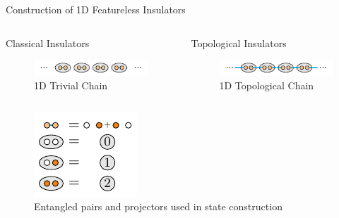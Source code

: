 \begin{frame}{Construction of 1D Featureless Insulators}
\vskip-1.5cm		
\begin{columns}[T]
	\begin{column}[T]{.5\textwidth}
		\begin{block}{Classical Insulators}
			\vskip0.55cm
			\begin{figure}
				\includegraphics[width=\linewidth] {diagrams/haldane_insulator_chain_trivial.pdf}
				\caption{1D Trivial Chain}
			\end{figure}
		\end{block}
	\end{column}
	\begin{column}[T]{.5\textwidth}
		\begin{block}{Topological Insulators}
			\vskip0.45cm
			\begin{figure}
				\includegraphics[width=\linewidth] {diagrams/haldane_insulator_chain.pdf}
				\caption{1D Topological Chain}
			\end{figure}
		\end{block}
	\end{column}
\end{columns}
\begin{center}
	\begin{figure}[]
		\includegraphics[width=0.4\textheight] {diagrams/haldane_insulator_chain_rules.pdf}
		\caption{Entangled pairs and projectors used in state construction}
	\end{figure}
\end{center}
\end{frame}

